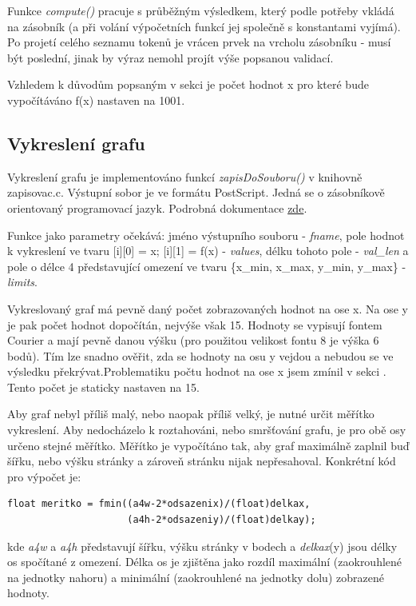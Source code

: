 \documentclass 	[a4paper,12pt]	{article}
\begin{document}
Funkce \emph{compute()} pracuje s průběžným výsledkem, který podle potřeby vkládá na zásobník (a při volání výpočetních funkcí jej společně s konstantami vyjímá). Po projetí celého seznamu tokenů je vrácen prvek na vrcholu zásobníku - musí být poslední, jinak by výraz nemohl projít výše popsanou validací.

Vzhledem k důvodům popsaným v sekci  je počet hodnot x pro které bude vypočítáváno f(x) nastaven na 1001.

\subsection{Vykreslení grafu}
\label{subsec:vyk_gr}
Vykreslení grafu je implementováno funkcí \emph{zapisDoSouboru()} v knihovně zapisovac.c. Výstupní sobor je ve formátu PostScript. Jedná se o zásobníkově orientovaný programovací jazyk. Podrobná dokumentace \href{https://www.adobe.com/products/postscript/pdfs/PLRM.pdf}{zde}.

Funkce jako parametry očekává: jméno výstupního souboru - \emph{fname}, pole hodnot k vykreslení ve tvaru [i][0] = x; [i][1] = f(x)  - \emph{values}, délku tohoto pole - \emph{val\_len} a pole o délce 4 představující omezení ve tvaru \{x\_min, x\_max, y\_min, y\_max\} - \emph{limits}.

Vykreslovaný graf má pevně daný počet zobrazovaných hodnot na ose x. Na ose y je pak počet hodnot dopočítán, nejvýše však 15. Hodnoty se vypisují fontem Courier a mají pevně danou výšku (pro použitou velikost fontu 8 je výška 6 bodů). Tím lze snadno ověřit, zda se hodnoty na osu y vejdou a nebudou se ve výsledku překrývat.Problematiku počtu hodnot na ose x jsem zmínil v sekci . Tento počet je staticky nastaven na 15.

Aby graf nebyl příliš malý, nebo naopak příliš velký, je nutné určit měřítko vykreslení. Aby nedocházelo k roztahováni, nebo smršťování grafu, je pro obě osy určeno stejné měřítko. Měřítko je vypočítáno tak, aby graf maximálně zaplnil buď šířku, nebo výšku stránky a zároveň stránku nijak nepřesahoval. Konkrétní kód pro výpočet je:
\begin{verbatim}
float meritko = fmin((a4w-2*odsazenix)/(float)delkax,
                     (a4h-2*odsazeniy)/(float)delkay);
\end{verbatim}
kde \emph{a4w} a \emph{a4h} představují šířku, výšku stránky v bodech a \emph{delkax}(y) jsou délky os spočítané z omezení. Délka os je zjištěna jako rozdíl maximální (zaokrouhlené na jednotky nahoru) a minimální (zaokrouhlené na jednotky dolu) zobrazené hodnoty.
\end{document}
